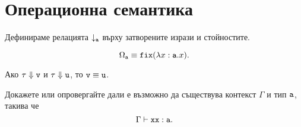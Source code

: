 \section{Операционна семантика}

Дефинираме релацията $\downarrow_{\vv{a}}$ върху затворените изрази и стойностите.

\begin{prooftree}
\end{prooftree}

\begin{prooftree}
\end{prooftree}

\begin{prooftree}
\end{prooftree}


\begin{example}
  \[\Omega_{\vv{a}} \equiv \fix(\lambda x:\vv{a} . x).\]
\end{example}


\begin{lemma}
  Ако $\tau \Downarrow \vv{v}$ и $\tau \Downarrow \vv{u}$, то $\vv{v} \equiv \vv{u}$.
\end{lemma}


\begin{problem}
  Докажете или опровергайте дали е възможно да съществува контекст $\Gamma$ и тип $\vv{a}$, такива че
  \[\Gamma \vdash \type{xx}{a}.\]
\end{problem}


